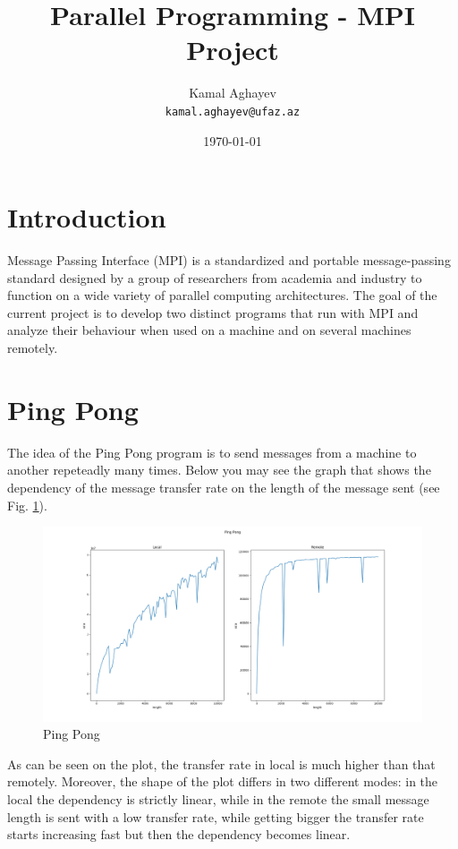 \documentclass{article}
\title{Parallel Programming - MPI Project}
\author{Kamal Aghayev\\
		\texttt{kamal.aghayev@ufaz.az}}
\date{\today}
\begin{document}
\maketitle

\section{Introduction}
	Message Passing Interface (MPI) is a standardized and portable message-passing standard designed by a group of researchers from academia and industry to function on a wide variety of parallel computing architectures.
	The goal of the current project is to develop two distinct programs that run with MPI and analyze their behaviour when used on a machine and on several machines remotely.
	
\section{Ping Pong}
	The idea of the Ping Pong program is to send messages from a machine to another repeteadly many times. Below you may see the graph that shows the dependency of the message transfer rate on the length of the message sent (see Fig. \ref{fig:ping_pong}).
	\begin{figure}[htbp]
    	\centering
    	\includegraphics[width=\textwidth]{ping_pong.png}
    	\caption{Ping Pong}
    	\label{fig:ping_pong}
	\end{figure}

	As can be seen on the plot, the transfer rate in local is much higher than that remotely. Moreover, the shape of the plot differs in two different modes: in the local the dependency is strictly linear, while in the remote the small message length is sent with a low transfer rate, while getting bigger the transfer rate starts increasing fast but then the dependency becomes linear.
	
\end{document}
